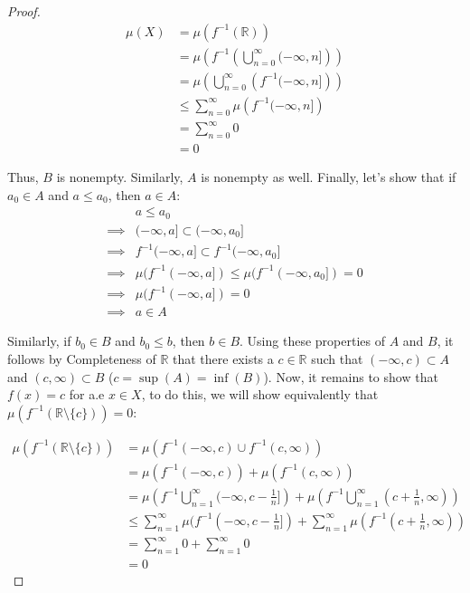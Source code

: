\documentclass{article}
\theoremstyle{definition}
\begin{document}
\begin{proof}
    \begin{align*}
        \mu(X) &= \mu(f^{-1}(\mathbb{R})) \\
          &= \mu \left( f^{-1} \left( \bigcup_{n=0}^{\infty}(-\infty,n] \right) \right) \\
          &= \mu \left( \bigcup_{n=0}^{\infty} \left( f^{-1} (-\infty,n] \right) \right) \\
          & \leq \sum_{n=0}^{\infty} \mu \left(f^{-1} (-\infty,n] \right) \\
          &= \sum_{n=0}^{\infty} 0 \\
          &= 0
    \end{align*}

    Thus, $B$ is nonempty. Similarly, $A$ is nonempty as well. Finally, let's show that if $a_0\in A$ and $a\leq a_0$, then $a\in A$:
    \begin{align*}
        & a \leq a_0 \\
        \implies & (-\infty, a] \subset (-\infty, a_0] \\
        \implies & f^{-1}(-\infty, a] \subset f^{-1}(-\infty, a_0] \\
        \implies & \mu(f^{-1}(-\infty, a]) \leq \mu(f^{-1}(-\infty, a_0]) = 0 \\
        \implies & \mu(f^{-1}(-\infty, a]) = 0\\
        \implies & a \in A
    \end{align*}

    Similarly, if $b_0\in B$ and $b_0\leq b$, then $b\in B$. Using these properties of $A$ and $B$, it follows by Completeness of $\mathbb{R}$ that there exists a $c\in \mathbb{R}$ such that $(-\infty, c)\subset A$ and $(c, \infty) \subset B$ ($c = \sup(A) = \inf(B)$). Now, it remains to show that $f(x)=c$ for a.e $x\in X$, to do this, we will show equivalently that $\mu(f^{-1}(\mathbb{R}\setminus \{c\}))=0$:

    \begin{align*}
        \mu(f^{-1}(\mathbb{R}\setminus \{c\})) &=  \mu(f^{-1}(-\infty,c)\cup f^{-1}(c, \infty)) \\
          &= \mu(f^{-1}(-\infty,c)) +  \mu(f^{-1}(c, \infty)) \\
          &= \mu \left(f^{-1} \bigcup_{n=1}^{\infty}(-\infty, c-\frac1n]\right) + \mu \left(f^{-1} \bigcup_{n=1}^{\infty}(c+\frac1n, \infty)\right)\\
          &\leq \sum_{n=1}^{\infty}\mu(f^{-1}(-\infty, c-\frac1n]) + \sum_{n=1}^{\infty}\mu(f^{-1}(c+\frac1n, \infty)) \\
          &= \sum_{n=1}^{\infty}0 + \sum_{n=1}^{\infty}0 \\
          &= 0
    \end{align*}


\end{proof}
\end{document}

